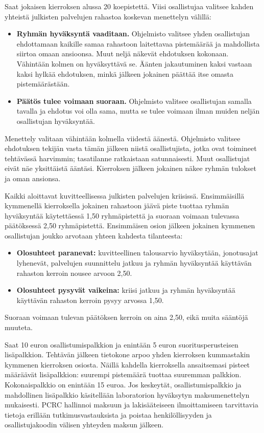 Saat jokaisen kierroksen alussa 20 koepistettä. Viisi osallistujaa valitsee kahden yhteistä julkisten palvelujen rahastoa koskevan menettelyn välillä:
\begin{itemize}
  \item \textbf{Ryhmän hyväksyntä vaaditaan.} Ohjelmisto valitsee yhden osallistujan ehdottamaan kaikille samaa rahastoon laitettavaa pistemäärää ja mahdollista siirtoa omaan ansioonsa. Muut neljä näkevät ehdotuksen kokonaan. Vähintään kolmen on hyväksyttävä se. Äänten jakautuminen kaksi vastaan kaksi hylkää ehdotuksen, minkä jälkeen jokainen päättää itse omasta pistemäärästään.
  \item \textbf{Päätös tulee voimaan suoraan.} Ohjelmisto valitsee osallistujan samalla tavalla ja ehdotus voi olla sama, mutta se tulee voimaan ilman muiden neljän osallistujan hyväksyntää.
\end{itemize}
Menettely valitaan vähintään kolmella viidestä äänestä. Ohjelmisto valitsee ehdotuksen tekijän vasta tämän jälkeen niistä osallistujista, jotka ovat toimineet tehtävässä harvimmin; tasatilanne ratkaistaan satunnaisesti. Muut osallistujat eivät näe yksittäistä ääntäsi. Kierroksen jälkeen jokainen näkee ryhmän tulokset ja oman ansionsa.

\begin{infobox}
Kaikki aloittavat kuvitteellisessa julkisten palvelujen kriisissä. Ensimmäisillä kymmenellä kierroksella jokainen rahastoon jäävä piste tuottaa ryhmän hyväksyntää käytettäessä 1,50 ryhmäpistettä ja suoraan voimaan tulevassa päätöksessä 2,50 ryhmäpistettä. Ensimmäisen osion jälkeen jokainen kymmenen osallistujan joukko arvotaan yhteen kahdesta tilanteesta:
\begin{itemize}
  \item \textbf{Olosuhteet paranevat:} kuvitteellinen talousarvio hyväksytään, jonotusajat lyhenevät, palvelujen suunnittelu jatkuu ja ryhmän hyväksyntää käyttävän rahaston kerroin nousee arvoon 2,50.
  \item \textbf{Olosuhteet pysyvät vaikeina:} kriisi jatkuu ja ryhmän hyväksyntää käyttävän rahaston kerroin pysyy arvossa 1,50.
\end{itemize}
Suoraan voimaan tulevan päätöksen kerroin on aina 2,50, eikä muita sääntöjä muuteta.
\end{infobox}

Saat 10 euron osallistumispalkkion ja enintään 5 euron suoritusperusteisen lisäpalkkion. Tehtävän jälkeen tietokone arpoo yhden kierroksen kummastakin kymmenen kierroksen osiosta. Näillä kahdella kierroksella ansaitsemasi pisteet määräävät lisäpalkkion: suurempi pistemäärä tuottaa suuremman palkkion. Kokonaispalkkio on enintään 15 euroa. Jos keskeytät, osallistumispalkkio ja mahdollinen lisäpalkkio käsitellään laboratorion hyväksytyn maksumenettelyn mukaisesti. PCRC hallinnoi maksuun ja lakisääteiseen ilmoittamiseen tarvittavia tietoja erillään tutkimusvastauksista ja poistaa henkilöllisyyden ja osallistujakoodin välisen yhteyden maksun jälkeen.

